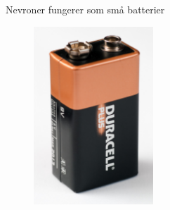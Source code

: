 \documentclass[presentation]{beamer}
\begin{document}
\begin{frame}{Nevroner fungerer som små batterier}
    \vspace{-0.5cm}
   \begin{figure}
       {\includegraphics[width=0.4\textwidth]{battery.jpg}}
\end{figure}
\end{frame}
\end{document}
